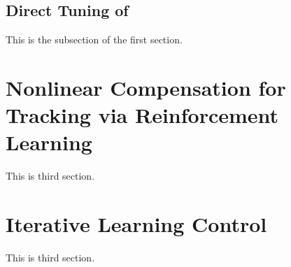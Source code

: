 \subsection{Direct Tuning of }

This is the subsection of the first section.


\section{Nonlinear Compensation for Tracking via Reinforcement Learning} \label{sec:nl_comp}
This is third section.

\section{Iterative Learning Control} \label{sec:ilc}
This is third section.


